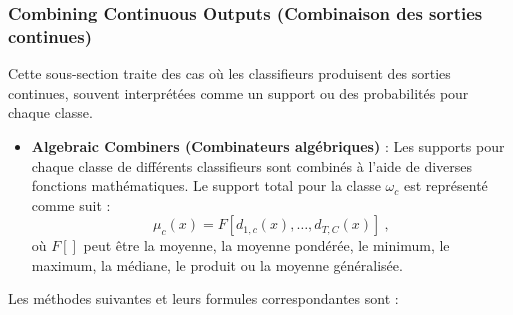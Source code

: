 \subsubsection*{Combining Continuous Outputs (Combinaison des sorties continues)}

Cette sous-section traite des cas où les classifieurs produisent des sorties continues, souvent interprétées comme un support ou des probabilités pour chaque classe.

\begin{itemize}
	\item \textbf{Algebraic Combiners (Combinateurs algébriques)} : Les supports pour chaque classe de différents classifieurs sont combinés à l'aide de diverses fonctions mathématiques. Le support total pour la classe $\omega_c$ est représenté comme suit :
	\[
	\mu_c(x) = F [d_{1,c}(x), \ldots, d_{T,C}(x)]~,
	\]
	où $F[]$ peut être la moyenne, la moyenne pondérée, le minimum, le maximum, la médiane, le produit ou la moyenne généralisée.
\end{itemize}
Les méthodes suivantes et leurs formules correspondantes sont :

